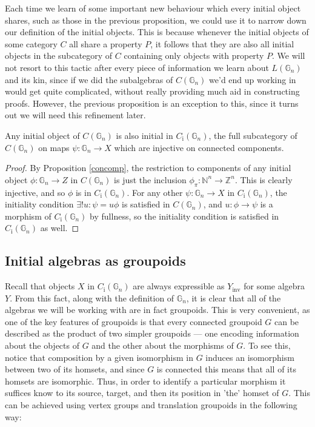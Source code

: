 \documentclass{amsart} %
\begin{document}
Each time we learn of some important new behaviour which every initial object shares, such as those in the previous proposition, we could use it to narrow down our definition of the initial objects. This is because whenever the initial objects of some category $C$ all share a property $P$, it follows that they are also all initial objects in the subcategory of $C$ containing only objects with property $P$. We will not resort to this tactic after every piece of information we learn about $L(\mathbb{G}_n)$ and its kin, since if we did the subalgebras of $C(\mathbb{G}_n)$ we'd end up working in would get quite complicated, without really providing much aid in constructing proofs. However, the previous proposition is an exception to this, since it turns out we will need this refinement later.

\begin{cor} Any initial object of $C(\mathbb{G}_n)$ is also initial in $C_{\mathrm{i}}(\mathbb{G}_n)$, the full subcategory of $C(\mathbb{G}_n)$ on maps $\psi: \mathbb{G}_n \to X$ which are injective on connected components. 
\end{cor}
\begin{proof}
By Proposition \ref{concomp}, the restriction to components of any initial object $\phi: \mathbb{G}_n \to Z$ in $C(\mathbb{G}_n)$ is just the inclusion $\phi_\pi : \mathbb{N}^n \to \mathbb{Z}^n$. This is clearly injective, and so $\phi$ is in $C_{\mathrm{i}}(\mathbb{G}_n)$. For any other $\psi: \mathbb{G}_n \to X$ in $C_{\mathrm{i}}(\mathbb{G}_n)$, the initiality condition $\exists ! u : \psi = u \phi$ is satisfied in $C(\mathbb{G}_n)$, and $u: \phi \to \psi$ is a morphism of $C_{\mathrm{i}}(\mathbb{G}_n)$ by fullness, so the initiality condition is satisfied in $C_{\mathrm{i}}(\mathbb{G}_n)$ as well.
\end{proof}

\subsection{Initial algebras as groupoids}

Recall that objects $X$ in $C_{\mathrm{i}}(\mathbb{G}_n)$ are always expressible as $Y_{\mathrm{inv}}$ for some algebra $Y$. From this fact, along with the definition of $\mathbb{G}_n$, it is clear that all of the algebras we will be working with are in fact groupoids. This is very convenient, as one of the key features of groupoids is that every connected groupoid $G$ can be described as the product of two simpler groupoids --- one encoding information about the objects of $G$ and the other about the morphisms of $G$. To see this, notice that composition by a given isomorphism in $G$ induces an isomorphism between two of its homsets, and since $G$ is connected this means that all of its homsets are isomorphic. Thus, in order to identify a particular morphism it suffices know to its source, target, and then its position in 'the' homset of $G$. This can be achieved using vertex groups and translation groupoids in the following way:
\end{document}
